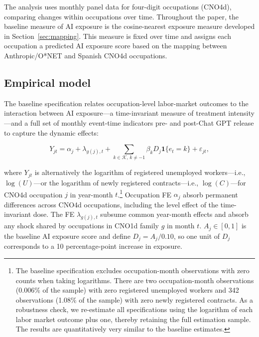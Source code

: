 The analysis uses monthly panel data for four-digit occupations (CNO4d), comparing changes within occupations over time. Throughout the paper, the baseline measure of AI exposure is the cosine-nearest exposure measure developed in Section~\ref{sec:mapping}. This measure is fixed over time and assigns each occupation a predicted AI exposure score based on the mapping between Anthropic/O*NET and Spanish CNO4d occupations.

\subsection{Empirical model}
\label{sec:empirical_model}

The baseline specification relates occupation-level labor-market outcomes to the interaction between AI exposure---a time-invariant measure of treatment intensity---and a full set of monthly event-time indicators pre- and post-Chat GPT release to capture the dynamic effects:

\begin{equation}
Y_{jt}=\alpha_j+\lambda_{g(j),t}+\sum_{k\in\mathcal{K},\,k\neq-1}\beta_k D_j\mathbf{1}\{e_t=k\}+\varepsilon_{jt},
\label{eq:baseline_dynamic}
\end{equation}

where $Y_{jt}$ is alternatively the logarithm of registered unemployed workers---i.e., $\log(U)$---or the logarithm of newly registered contracts---i.e., $\log(C)$---for CNO4d occupation $j$ in year-month $t$.\footnote{The baseline specification excludes occupation-month observations with zero counts when taking logarithms. There are two occupation-month observations (0.006\% of the sample) with zero registered unemployed workers and 342 observations (1.08\% of the sample) with zero newly registered contracts. As a robustness check, we re-estimate all specifications using the logarithm of each labor market outcome plus one, thereby retaining the full estimation sample. The results are quantitatively very similar to the baseline estimates.} Occupation FE \(\alpha_j\) absorb permanent differences across CNO4d occupations, including the level effect of the time-invariant dose. The FE \(\lambda_{g(j),t}\) subsume common year-month effects and absorb any shock shared by occupations in CNO1d family \(g\) in month \(t\). \(A_j\in[0,1]\) is the baseline AI exposure score and define \(D_j=A_j/0.10\), so one unit of \(D_j\) corresponds to a 10 percentage-point increase in exposure. 

